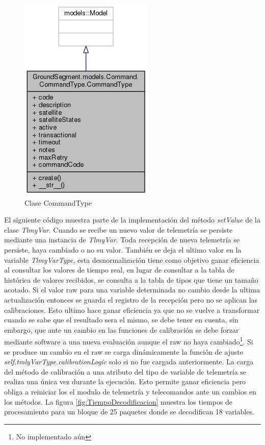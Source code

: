 \documentclass[twoside,twocolumn]{article}
\begin{document}
\begin{figure}[!htb]
\begin{minipage}{0.2\textwidth}
        \centering
        \includegraphics[width=0.5\linewidth]{Imagenes/CommandType.png}
        \caption{Clase CommandType}
        \label{fig:prob1_6_1}
    \end{minipage}
\end{figure}

El siguiente código muestra parte de la implementación del método \textit{setValue} de la clase \textit{TlmyVar}. Cuando se recibe un nuevo valor de telemetría se persiste mediante una instancia de \textit{TlmyVar}. Toda recepción de nueva telemetría se persiste, haya cambiado o no su valor. También se deja el ultimo valor en la variable \textit{TlmyVarType}, esta desnormalización tiene como objetivo ganar eficiencia al consultar los valores de tiempo real, en lugar de consultar a la tabla de histórica de valores recibidos, se consulta a la tabla de tipos que tiene un tamaño acotado. Si el valor raw para una variable determinada no cambio desde la ultima actualización entonces se guarda el registro de la recepción pero no se aplican las calibraciones. Esto ultimo hace ganar eficiencia ya que no se vuelve a transformar cuando se sabe que el resultado sera el mismo, se debe tener en cuenta, sin embargo, que ante un cambio en las funciones de calibración se debe forzar mediante software a una nueva evaluación aunque el raw no haya cambiado\footnote{No implementado aún}.
Si se produce un cambio en el raw se carga dinámicamente la función de ajuste \textit{self.tmlyVarType.calibrationLogic} solo si no fue cargada anteriormente. La carga del método de calibración a una atributo del tipo de variable de telemetría se realiza una única vez durante la ejecución. Esto permite ganar eficiencia pero obliga a reiniciar los el modulo de telemetría y telecomandos ante un cambios en los métodos. La figura \ref{fig:TiempoDecodificacion} muestra los tiempos de procesamiento para un bloque de 25 paquetes donde se decodifican 18 variables.
\end{document}
